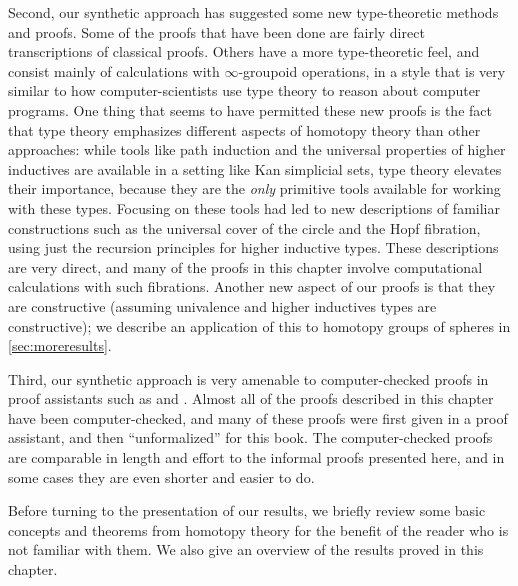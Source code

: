 Second, our synthetic approach has suggested some new type-theoretic
methods and proofs.  Some of the proofs that  have been done are fairly
direct transcriptions of classical proofs.  Others have a more
type-theoretic feel, and consist mainly of calculations with
$\infty$-groupoid operations, in a style that is very similar to how
computer-scientists use type theory to reason about computer programs.
One thing that seems to have permitted these new proofs is the fact that type theory
emphasizes different aspects of homotopy theory than other approaches:
while tools like path induction and the universal properties of higher
inductives are available in a setting like Kan simplicial sets, type
theory elevates their importance, because they are the \emph{only}
primitive tools available for working with these types.  Focusing on
these tools had led to new descriptions of familiar constructions such
as the universal cover of the circle and the Hopf fibration, using just the
recursion principles for higher inductive types.  These descriptions are
very direct, and many of the proofs in this chapter involve
computational calculations with such fibrations.
%
Another new aspect of our proofs is that they are constructive (assuming
univalence and higher inductives types are constructive); we describe an
application of this to homotopy groups of spheres in
\cref{sec:moreresults}.    

%
Third, our synthetic approach is very amenable to computer-checked
proofs in proof assistants such as \Coq and \Agda.
Almost all of the proofs
described in this chapter have been computer-checked, and many of these
proofs were first given in a proof assistant, and then ``unformalized''
for this book.  The computer-checked proofs are comparable in length and
effort to the informal proofs presented here, and in some cases they are
even shorter and easier to do.  

\mentalpause

Before turning to the presentation of our results, we briefly review some
 basic concepts and theorems from homotopy theory for the benefit of the reader who is not familiar with them.
 We also give an overview of the
results proved in this chapter.  


